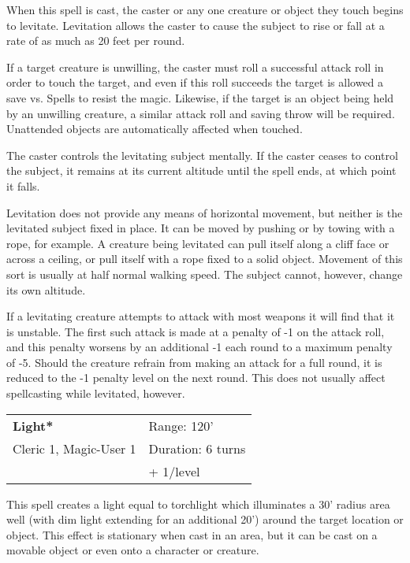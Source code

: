 \documentclass[a4paper,twoside,openany,10pt]{book}
\begin{document}
\begin{multicols}{2}
When this spell is cast, the caster or any one creature or object they touch begins to levitate. Levitation allows the caster to cause the subject to rise or fall at a rate of as much as 20 feet per round. 

If a target creature is unwilling, the caster must roll a successful attack roll in order to touch the target, and even if this roll succeeds the target is allowed a save vs. Spells to resist the magic. Likewise, if the target is an object being held by an unwilling creature, a similar attack roll and saving throw will be required. Unattended objects are automatically affected when touched.

The caster controls the levitating subject mentally. If the caster ceases to control the subject, it remains at its current altitude until the spell ends, at which point it falls.

Levitation does not provide any means of horizontal movement, but neither is the levitated subject fixed in place. It can be moved by pushing or by towing with a rope, for example. A creature being levitated can pull itself along a cliff face or across a ceiling, or pull itself with a rope fixed to a solid object. Movement of this sort is usually at half normal walking speed. The subject cannot, however, change its own altitude.

If a levitating creature attempts to attack with most weapons it will find that it is unstable. The first such attack is made at a penalty of -1 on the attack roll, and this penalty worsens by an additional -1 each round to a maximum penalty of -5. Should the creature refrain from making an attack for a full round, it is reduced to the -1 penalty level on the next round. This does not usually affect spellcasting while levitated, however.


\smallskip\begin{flushleft} 
	\begin{tabularx}{0.45\textwidth}{@{}m{3.4cm}m{5.5cm}@{}} 
		\textbf{Light*} & Range: 120'\\
Cleric 1, Magic-User 1 & Duration: 6 turns\\
&+ 1/level\\
	\end{tabularx}\end{flushleft}

This spell creates a light equal to torchlight which illuminates a 30' radius area well (with dim light extending for an additional 20') around the target location or object. This effect is stationary when cast in an area, but it can be cast on a movable object or even onto a character or creature.


\end{multicols}
\end{document}

